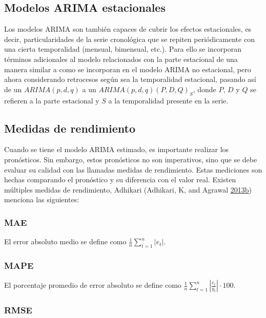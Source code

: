 \documentclass[]{article}
\begin{document}
\subsection{Modelos ARIMA estacionales}

Los modelos ARIMA son también capaces de cubrir los efectos
estacionales, es decir, particularidades de la serie cronológica que se
repiten periódicamente con una cierta temporalidad (mensual, bimensual,
etc.). Para ello se incorporan términos adicionales al modelo
relacionados con la parte estacional de una manera similar a como se
incorporan en el modelo ARIMA no estacional, pero ahora considerando
retrocesos según sea la temporalidad estacional, pasando así de un
\(ARIMA(p,d,q)\) a un \(ARIMA(p,d,q)(P,D,Q)_S\), donde \(P\), \(D\) y
\(Q\) se refieren a la parte estacional y \(S\) a la temporalidad
presente en la serie.

\subsection{Medidas de rendimiento}

Cuando se tiene el modelo ARIMA estimado, es importante realizar los
pronósticos. Sin embargo, estos pronósticos no son imperativos, sino que
se debe evaluar su calidad con las llamadas medidas de rendimiento.
Estas mediciones son hechas comparando el pronóstico y su diferencia con
el valor real. Existen múltiples medidas de rendimiento, Adhikari
(Adhikari, K, and Agrawal
\protect\hyperlink{ref-medidas}{2013}\protect\hyperlink{ref-medidas}{b})
menciona las siguientes:

\subsubsection{MAE}

El error absoluto medio se define como
\(\frac{1}{n}\sum_{t=1}^n |e_t|\).

\subsubsection{MAPE}

El porcentaje promedio de error absoluto se define como
\(\frac{1}{n}\sum_{t=1}^n \left|\frac{e_t}{y_t}\right|\cdot 100\).

\subsubsection{RMSE}
\end{document}
